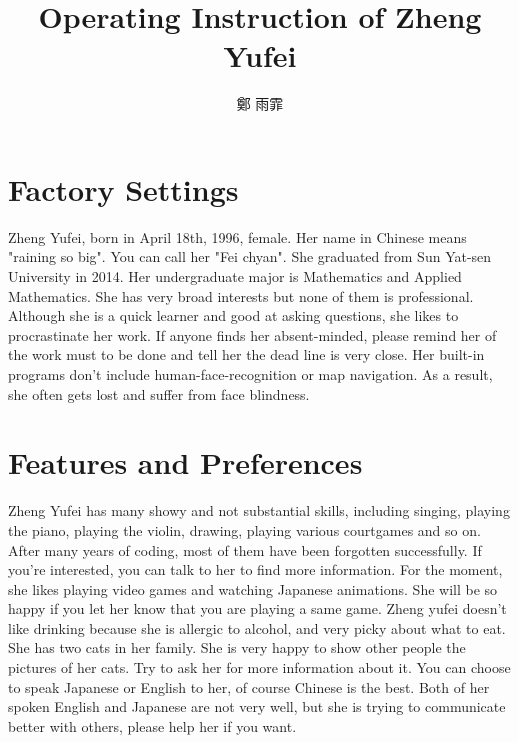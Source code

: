 \documentclass[a4]{jarticle}
\title{Operating Instruction of Zheng Yufei}
\author{鄭 雨霏} %
\begin{document}
    \twocolumn{
    \maketitle
    }

    \section{Factory Settings}


    Zheng Yufei, born in April 18th, 1996, female. Her name in Chinese means "raining so big".
    You can call her "Fei chyan". She graduated from
    Sun Yat-sen University in 2014. Her undergraduate major is Mathematics
    and Applied Mathematics. She has very broad interests but none of
    them is professional. Although she is a quick learner and good at
    asking questions, she likes to procrastinate her work. If anyone
    finds her absent-minded, please remind her of the work must to be
    done and tell her the dead line is very close. Her built-in programs
    don't include human-face-recognition or map navigation. As a result,
    she often gets lost and suffer from face blindness.

    \section{Features and Preferences}

    Zheng Yufei has many showy and not substantial skills, including singing,
    playing the piano, playing the violin, drawing, playing various courtgames
    and so on. After many years of coding, most of them have been forgotten
    successfully. If you're interested, you can talk to her to find more
    information. For the moment, she likes playing video games and watching
    Japanese animations. She will be so happy if you let her know that you
    are playing a same game. Zheng yufei doesn't like drinking because she
    is allergic to alcohol, and very picky about what to eat. She has two cats in
    her family. She is very happy to show other people the pictures of her cats.
    Try to ask her for more information about it. You can choose to speak
    Japanese or English to her, of course Chinese is the best. Both of her spoken
    English and Japanese are not very well, but she is trying to communicate
    better with others, please help her if you want.
\end{document}
